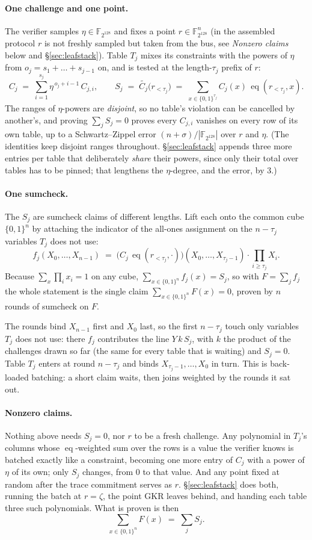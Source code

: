 \documentclass[11pt]{article}
\newcommand{\F}{\mathbb{F}}
\newcommand{\eq}{\operatorname{eq}}
\newcommand{\cube}[1]{\{0,1\}^{#1}}
\begin{document}
\paragraph{One challenge and one point.} The verifier samples $\eta\in\F_{2^{128}}$ and fixes a point $r\in\F_{2^{128}}^{n}$ (in the assembled protocol $r$ is not freshly sampled but taken from the bus, see \emph{Nonzero claims} below and \S\ref{sec:leafstack}). Table $T_j$ mixes its constraints with the powers of $\eta$ from $o_j=s_1+\dots+s_{j-1}$ on, and is tested at the length-$\tau_j$ prefix of $r$:
\[
  C_j\;=\;\sum_{i=1}^{s_j}\eta^{\,o_j+i-1}\,C_{j,i},
  \qquad
  S_j\;=\;\widetilde{C_j}\bigl(r_{<\tau_j}\bigr)\;=\;\sum_{x\in\cube{\tau_j}}C_j(x)\,\eq(r_{<\tau_j},x).
\]
The ranges of $\eta$-powers are \emph{disjoint}, so no table's violation can be cancelled by another's, and proving $\sum_j S_j=0$ proves every $C_{j,i}$ vanishes on every row of its own table, up to a Schwartz--Zippel error $(n+\sigma)/|\F_{2^{128}}|$ over $r$ and $\eta$. (The identities keep disjoint ranges throughout. \S\ref{sec:leafstack} appends three more entries per table that deliberately \emph{share} their powers, since only their total over tables has to be pinned; that lengthens the $\eta$-degree, and the error, by $3$.)

\paragraph{One sumcheck.} The $S_j$ are sumcheck claims of different lengths. Lift each onto the common cube $\cube n$ by attaching the indicator of the all-ones assignment on the $n-\tau_j$ variables $T_j$ does not use:
\[
  f_j(X_0,\dots,X_{n-1})\;=\;\bigl(C_j\,\eq(r_{<\tau_j},\cdot)\bigr)(X_0,\dots,X_{\tau_j-1})\cdot\prod_{i\ge\tau_j}X_i .
\]
Because $\sum_x\prod_i x_i=1$ on any cube, $\sum_{x\in\cube n}f_j(x)=S_j$, so with $F=\sum_j f_j$ the whole statement is the single claim $\sum_{x\in\cube n}F(x)=0$, proven by $n$ rounds of sumcheck on $F$.

The rounds bind $X_{n-1}$ first and $X_0$ last, so the first $n-\tau_j$ touch only variables $T_j$ does not use: there $f_j$ contributes the line $Y\,k\,S_j$, with $k$ the product of the challenges drawn so far (the same for every table that is waiting) and $S_j=0$. Table $T_j$ enters at round $n-\tau_j$ and binds $X_{\tau_j-1},\dots,X_0$ in turn. This is back-loaded batching: a short claim waits, then joins weighted by the rounds it sat out.

\paragraph{Nonzero claims.} Nothing above needs $S_j=0$, nor $r$ to be a fresh challenge. Any polynomial in $T_j$'s columns whose $\eq$-weighted sum over the rows is a value the verifier knows is batched exactly like a constraint, becoming one more entry of $C_j$ with a power of $\eta$ of its own; only $S_j$ changes, from $0$ to that value. And any point fixed at random after the trace commitment serves as $r$. \S\ref{sec:leafstack} does both, running the batch at $r=\zeta$, the point GKR leaves behind, and handing each table three such polynomials. What is proven is then
\[
  \sum_{x\in\cube n}F(x)\;=\;\sum_j S_j .
\]
\end{document}
